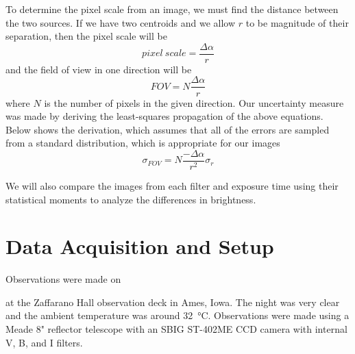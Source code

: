 \documentclass[%
aip,
jmp,
reprint,
floatfix,
nobibfootnote,
]{revtex4-1}
\begin{document}
	To determine the pixel scale from an image, we must find the distance between the two sources. If we have two centroids and we allow $r$ to be magnitude of their separation, then the pixel scale will be
	\begin{equation}
		pixel\ scale = \frac{\Delta\alpha}{r}
		\label{eqn:pscale}
	\end{equation}
	and the field of view in one direction will be 
	\begin{equation}
		FOV = N \frac{\Delta\alpha}{r}
		\label{eqn:fov}
	\end{equation}
	where $N$ is the number of pixels in the given direction. Our uncertainty measure was made by deriving the least-squares propagation of the above equations. Below shows the derivation, which assumes that all of the errors are sampled from a standard distribution, which is appropriate for our images
	\begin{equation}
		\sigma_{FOV} = N \frac{-\Delta\alpha}{r^2} \sigma_r
	\end{equation}
	
	We will also compare the images from each filter and exposure time using their statistical moments to analyze the differences in brightness.
	


	\section{Data Acquisition and Setup}
	Observations were made on \date{30 August 2017} at the Zaffarano Hall observation deck in Ames, Iowa. The night was very clear and the ambient temperature was around \SI{32}{\degreeCelsius}. Observations were made using a Meade 8" reflector telescope with an SBIG ST-402ME CCD camera with internal V, B, and I filters. 
	
\end{document}
